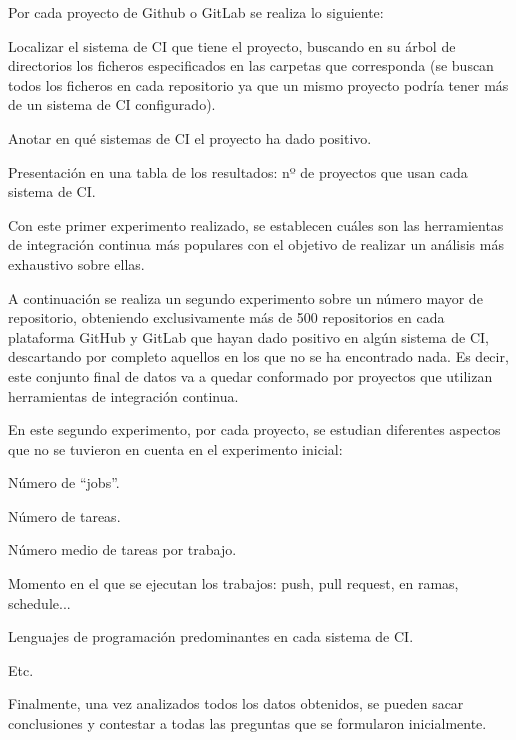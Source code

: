 Por cada proyecto de Github o GitLab se realiza lo siguiente:
\begin{compactitem}
    \item Localizar el sistema de CI que tiene el proyecto, buscando en su árbol de directorios los ficheros especificados en las carpetas que corresponda (se buscan todos los ficheros en cada repositorio ya que un mismo proyecto podría tener más de un sistema de CI configurado).
    \item Anotar en qué sistemas de CI el proyecto ha dado positivo.
    \item Presentación en una tabla de los resultados: nº de proyectos que usan cada sistema de CI.
\end{compactitem}
	
Con este primer experimento realizado, se establecen cuáles son las herramientas de integración continua más populares con el objetivo de realizar un análisis más exhaustivo sobre ellas.

A continuación se realiza un segundo experimento sobre un número mayor de repositorio, obteniendo exclusivamente más de 500 repositorios en cada plataforma GitHub y  GitLab que hayan dado positivo en algún sistema de CI, descartando por completo aquellos en los que no se ha encontrado nada. Es decir, este conjunto final de datos va a quedar conformado por proyectos que utilizan herramientas de integración continua.

En este segundo experimento, por cada proyecto, se estudian diferentes aspectos que no se tuvieron en cuenta en el experimento inicial:
\begin{compactitem}
    \item Número de ``jobs''.
    \item Número de tareas.
    \item Número medio de tareas por trabajo.
    \item Momento en el que se ejecutan los trabajos: push, pull request, en ramas, schedule...
    \item Lenguajes de programación predominantes en cada sistema de CI.
    \item Etc.
\end{compactitem}

Finalmente, una vez analizados todos los datos obtenidos, se pueden sacar conclusiones y contestar a todas las preguntas que se formularon inicialmente.
	
